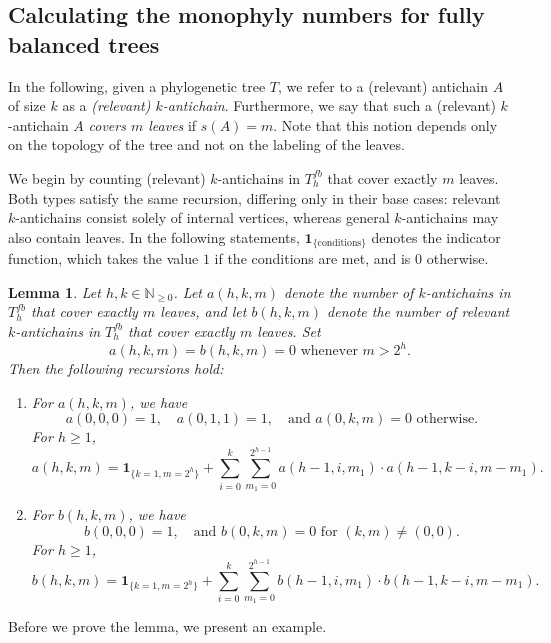 \documentclass{amsart}
\newtheorem{lemma}[theorem]{Lemma}
\theoremstyle{definition}
\begin{document}
\subsection{Calculating the monophyly numbers for fully balanced trees}

In the following, given a phylogenetic tree $T$, we refer to a (relevant) antichain $A$ of size $k$ as a \emph{(relevant) $k$-antichain}. Furthermore, we say that such a  (relevant) $k$-antichain $A$ \emph{covers $m$ leaves} if $s(A) = m$. Note that this notion depends only on the topology of the tree and not on the labeling of the leaves.


We begin by counting (relevant) $k$-antichains in $T_h^{fb}$ that cover exactly $m$ leaves. Both types satisfy the same recursion, differing only in their base cases: relevant $k$-antichains consist solely of internal vertices, whereas general $k$-antichains may also contain leaves. In the following statements, $\boldsymbol{1}_{\{\text{conditions}\}}$ denotes the indicator function, which takes the value $1$ if the conditions are met, and is 0 otherwise.

\begin{lemma} \label{lem:antichaincover-fb}
    Let $h,k \in \mathbb{N}_{\geq 0}$. Let $a(h,k,m)$ denote the number of $k$-antichains in $T_h^{fb}$ that cover exactly $m$ leaves, and let $b(h,k,m)$ denote the number of relevant $k$-antichains in $T_h^{fb}$ that cover exactly $m$ leaves. Set
    \[ a(h,k,m)= b(h,k,m)=0  \text{ whenever }  m>2^h.\] 
    Then the following recursions hold:
    \begin{enumerate}
        \item For $a(h,k,m)$, we have
           \[ a(0,0,0)=1, \quad a(0,1,1) = 1, \quad \text{and } a(0,k,m)=0 \text{ otherwise}.\] For $h \geq 1$, 
         \[ a(h,k,m) = \mathbf{1}_{\{k=1,m=2^h\}} + \sum\limits_{i=0}^{k} \sum\limits_{m_1=0}^{2^{h-1}} a(h-1,i,m_1) \cdot a(h-1,k-i,m-m_1).\]
        \item For $b(h,k,m)$, we have
          \[ b(0,0,0)=1, \quad \text{and } b(0,k,m) = 0 \text{ for } (k,m) \neq (0,0).\] For $h \geq 1$, 
         \[ b(h,k,m) = \mathbf{1}_{\{k=1,m=2^h\}} + \sum\limits_{i=0}^{k} \sum\limits_{m_1=0}^{2^{h-1}} b(h-1,i,m_1) \cdot b(h-1,k-i,m-m_1).\]
    \end{enumerate}
\end{lemma}

Before we prove the lemma, we present an example. 
\end{document}
